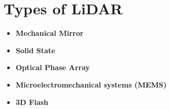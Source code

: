 \section{Types of LiDAR}
\label{app:lidar}
\begin{itemize}
	\item \textbf{Mechanical Mirror}
	\item \textbf{Solid State}
	\item \textbf{Optical Phase Array}
	\item \textbf{Microelectromechanical systems (MEMS)}
	\item \textbf{3D Flash}
\end{itemize}





\